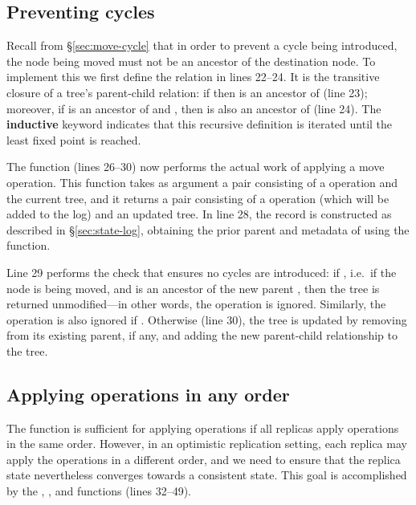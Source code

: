 \documentclass[10pt,journal,compsoc]{IEEEtran}
\begin{document}
\subsection{Preventing cycles}\label{sec:prevent-cycles}

Recall from \S\ref{sec:move-cycle} that in order to prevent a cycle being introduced, the node being moved must not be an ancestor of the destination node.
To implement this we first define the  relation in lines 22--24.
It is the transitive closure of a tree's parent-child relation: if  then  is an ancestor of  (line 23); moreover, if  is an ancestor of  and , then  is also an ancestor of  (line 24).
The \textbf{inductive} keyword indicates that this recursive definition is iterated until the least fixed point is reached.

The  function (lines 26--30) now performs the actual work of applying a move operation.
This function takes as argument a pair consisting of a  operation and the current tree, and it returns a pair consisting of a  operation (which will be added to the log) and an updated tree.
In line 28, the  record is constructed as described in \S\ref{sec:state-log}, obtaining the prior parent and metadata of  using the  function.

Line 29 performs the check that ensures no cycles are introduced: if , i.e.\ if the node  is being moved, and  is an ancestor of the new parent , then the tree is returned unmodified---in other words, the operation is ignored.
Similarly, the operation is also ignored if .
Otherwise (line 30), the tree is updated by removing  from its existing parent, if any, and adding the new parent-child relationship  to the tree.

\subsection{Applying operations in any order}\label{sec:applying}

The  function is sufficient for applying operations if all replicas apply operations in the same order.
However, in an optimistic replication setting, each replica may apply the operations in a different order, and we need to ensure that the replica state nevertheless converges towards a consistent state.
This goal is accomplished by the , , and  functions (lines 32--49).
\end{document}
